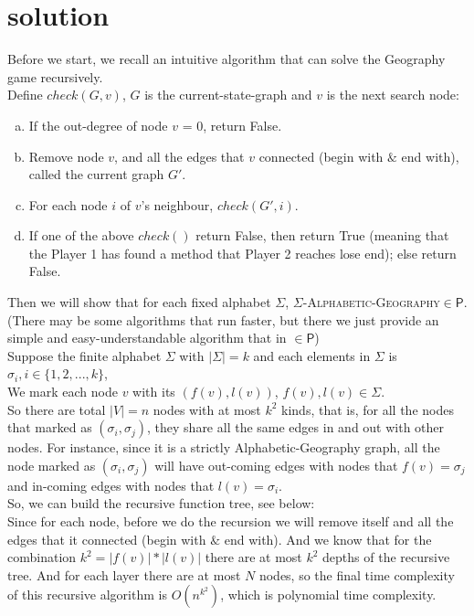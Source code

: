 \section{solution} 
Before we start, we recall an intuitive algorithm that can solve the Geography game recursively.\\
Define $check(G,v)$, $G$ is the current-state-graph and $v$ is the next search node: 
\begin{enumerate}[(a)]
    \item If the out-degree of node $v$ = 0, return False.
    \item Remove node $v$, and all the edges that $v$ connected (begin with $\&$ end with), called the current graph $G'$.
    \item For each node $i$ of $v$'s neighbour, $check(G',i)$.
    \item If one of the above $check()$ return False, then return True (meaning that the Player 1 has found a method that Player 2 reaches lose end); else return False.
\end{enumerate}
Then we will show that for each fixed alphabet $\Sigma$,
    $\Sigma$\textsc{-Alphabetic-Geography}$\in\mathsf{P}$.\\
    (There may be some algorithms that run faster, but there we just provide an simple and easy-understandable algorithm that in $\in\mathsf{P}$)\\
    Suppose the finite alphabet $\Sigma$ with $|\Sigma|=k$ and each elements in $\Sigma$ is $\sigma_i, i\in \{1,2,...,k\}$,\\
    We mark each node $v$ with its $(f(v),l(v))$, $f(v),l(v)\in \Sigma$.\\
    So there are total $|V|=n$ nodes with at most $k^2$ kinds, that is, for all the nodes that marked as $(\sigma_i,\sigma_j)$, they share all the same edges in and out with other nodes. For instance, since it is a strictly Alphabetic-Geography graph, all the node marked as $(\sigma_i,\sigma_j)$ will have out-coming edges with nodes that $f(v)=\sigma_j$ and in-coming edges with nodes that $l(v)=\sigma_i$.\\
    So, we can build the recursive function tree, see below:\\
    Since for each node, before we do the recursion we will remove itself and all the edges that it connected (begin with $\&$ end with). And we know that for the combination $k^2=|f(v)|*|l(v)|$ there are at most $k^2$ depths of the recursive tree. And for each layer there are at most $N$ nodes, so the final time complexity of this recursive algorithm is $O(n^{k^2})$, which is polynomial time complexity.
